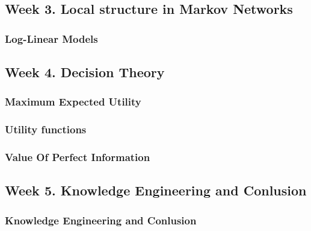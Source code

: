 \documentclass[a4paper,10pt]{article}
\begin{document}


\subsection{Week 3. Local structure in Markov Networks}

\subsubsection{Log-Linear Models}




\subsection{Week 4. Decision Theory}

\subsubsection{Maximum Expected Utility}



\subsubsection{Utility functions}




\subsubsection{Value Of Perfect Information}



\subsection{Week 5. Knowledge Engineering and Conlusion}

\subsubsection{Knowledge Engineering and Conlusion}


\end{document}

